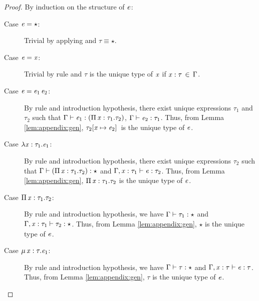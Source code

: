 \begin{proof}
	By induction on the structure of $\mathit{e}$:
	\begin{description}
	    \item[Case $\mathit{e}  =  \star$:] Trivial by applying  and $\tau  \equiv  \star$.
		\item[Case $\mathit{e}  =  \mathit{x}$:] Trivial by rule  and $\tau$ is the unique type of $\mathit{x}$ if $\mathit{x}  :  \tau \, \in \, \Gamma$.
		\item[Case $\mathit{e}=\mathit{e_{{\mathrm{1}}}} \, \mathit{e_{{\mathrm{2}}}}$:] By rule  and introduction hypothesis, there exist unique expressions $\tau_{{\mathrm{1}}}$ and $\tau_{{\mathrm{2}}}$ such that $\Gamma  \vdash  \mathit{e_{{\mathrm{1}}}}  :  (  \Pi \, \mathit{x}  :  \tau_{{\mathrm{1}}}  .  \tau_{{\mathrm{2}}}  )$, $\Gamma  \vdash  \mathit{e_{{\mathrm{2}}}}  :  \tau_{{\mathrm{1}}}$. Thus, from Lemma \ref{lem:appendix:gen}, $\tau_{{\mathrm{2}}}  [  \mathit{x}  \mapsto  \mathit{e_{{\mathrm{2}}}}  ] \,$ is the unique type of $\mathit{e}$.
		\item[Case $\lambda  \mathit{x}  :  \tau_{{\mathrm{1}}}  .  \mathit{e_{{\mathrm{1}}}}$:] By rule  and introduction hypothesis, there exist unique expressions $\tau_{{\mathrm{2}}}$ such that $\Gamma  \vdash  (  \Pi \, \mathit{x}  :  \tau_{{\mathrm{1}}}  .  \tau_{{\mathrm{2}}}  )  :  \star$ and $\Gamma  ,  \mathit{x}  :  \tau_{{\mathrm{1}}}  \vdash  \mathit{e}  :  \tau_{{\mathrm{2}}}$. Thus, from Lemma \ref{lem:appendix:gen}, $\Pi \, \mathit{x}  :  \tau_{{\mathrm{1}}}  .  \tau_{{\mathrm{2}}}$ is the unique type of $\mathit{e}$.
		\item[Case $\Pi \, \mathit{x}  :  \tau_{{\mathrm{1}}}  .  \tau_{{\mathrm{2}}}$:] By rule  and introduction hypothesis, we have $\Gamma  \vdash  \tau_{{\mathrm{1}}}  :  \star$ and $\Gamma  ,  \mathit{x}  :  \tau_{{\mathrm{1}}}  \vdash  \tau_{{\mathrm{2}}}  :  \star$. Thus, from Lemma \ref{lem:appendix:gen}, $\star$ is the unique type of $\mathit{e}$.
		\item[Case $\mu \, \mathit{x}  :  \tau  .  \mathit{e_{{\mathrm{1}}}}$:] By rule  and introduction hypothesis, we have $\Gamma  \vdash  \tau  :  \star$ and $\Gamma  ,  \mathit{x}  :  \tau  \vdash  \mathit{e}  :  \tau$. Thus, from Lemma \ref{lem:appendix:gen}, $\tau$ is the unique type of $\mathit{e}$.

\end{description}
\end{proof}

